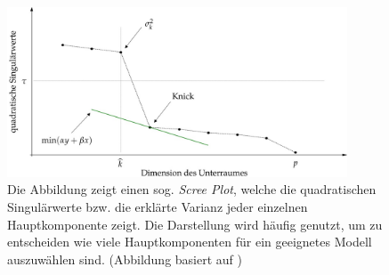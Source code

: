 \begin{figure}
\includegraphics[width=0.9\textwidth]{figures/scree_plot_explanation.jpg}
\caption{Die Abbildung zeigt einen sog. \textit{Scree Plot}, welche die quadratischen Singulärwerte bzw. die erklärte Varianz jeder einzelnen Hauptkomponente zeigt. Die Darstellung wird häufig genutzt, um zu entscheiden wie viele Hauptkomponenten für ein geeignetes Modell auszuwählen sind. (Abbildung basiert auf \cite{vidal})}
\label{scree_plot}
\end{figure}





